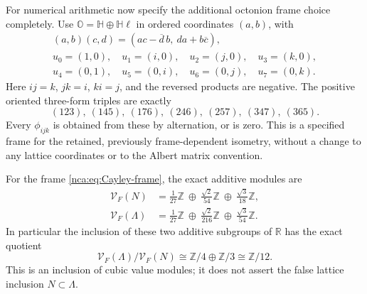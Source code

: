 For numerical arithmetic now specify the additional octonion frame
choice completely.  Use \(\mathbb O=\mathbb H\oplus\mathbb H\ell\)
in ordered coordinates \((a,b)\), with
\begin{equation}
 \begin{gathered}
 (a,b)(c,d)=(ac-\overline d\,b,\ da+b\overline c),\\
 u_0=(1,0),\quad u_1=(i,0),\quad u_2=(j,0),\quad u_3=(k,0),\\
 u_4=(0,1),\quad u_5=(0,i),\quad u_6=(0,j),\quad u_7=(0,k).
 \end{gathered}
 \label{nca:eq:Cayley-frame}
\end{equation}
Here \(ij=k\), \(jk=i\), \(ki=j\), and the reversed products
are negative.  The positive oriented three-form triples are exactly
\begin{equation}
 (123),\ (145),\ (176),\ (246),\ (257),\ (347),\ (365).
 \label{nca:eq:seven-triples}
\end{equation}
Every \(\phi_{ijk}\) is obtained from these by alternation, or is
zero.  This is a specified frame for the retained, previously
frame-dependent isometry, without a change to any lattice coordinates
or to the Albert matrix convention.

\begin{theorem}
\label{nca:thm:value-modules}
For the frame \eqref{nca:eq:Cayley-frame}, the exact additive modules are
\begin{align}
 \mathcal V_F(N)
    &=\frac1{27}\mathbb Z\ \oplus\
       \frac{\sqrt2}{54}\mathbb Z\ \oplus\
       \frac{\sqrt3}{18}\mathbb Z,\label{nca:eq:N-values}\\
 \mathcal V_F(\Lambda)
    &=\frac1{27}\mathbb Z\ \oplus\
       \frac{\sqrt2}{216}\mathbb Z\ \oplus\
       \frac{\sqrt3}{54}\mathbb Z.\label{nca:eq:Lambda-values}
\end{align}
In particular the inclusion of these two additive subgroups of
\(\mathbb R\) has the exact quotient
\begin{equation}
 \mathcal V_F(\Lambda)/\mathcal V_F(N)
                  \cong\mathbb Z/4\oplus\mathbb Z/3
                  \cong\mathbb Z/12.
 \label{nca:eq:value-quotient}
\end{equation}
This is an inclusion of cubic value modules; it does not assert the
false lattice inclusion \(N\subset\Lambda\).
\end{theorem}


